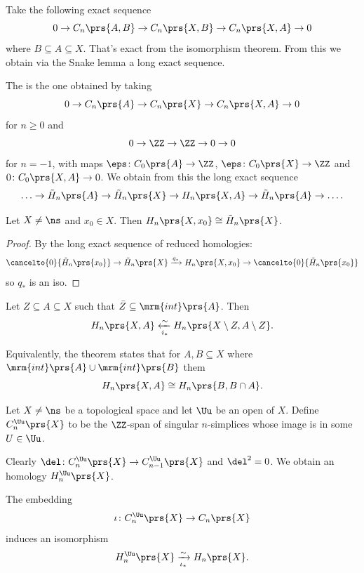 \documentclass[10pt,a4paper,twoside,openany,hidelinks]{book}
\newcommand{\ra}{\rightarrow}
\begin{document}
\begin{example}
Take the following exact sequence
\[0 \to C_n\prs{A,B} \to C_n\prs{X,B} \to C_n\prs{X,A} \to 0\]
where $B \subseteq A \subseteq X$. That's exact from the isomorphism theorem.
From this we obtain via the Snake lemma a long exact sequence.
\end{example}
\begin{definition}
The  is the one obtained by taking
\[0 \ra C_n\prs{A} \ra C_n\prs{X} \ra C_n\prs{X,A} \ra 0\]
for $n \geq 0$ and
\[0 \ra \ZZ \ra \ZZ \ra 0 \ra 0\]
for $n = -1$, with maps $\eps \colon C_0\prs{A} \to \ZZ$, $\eps \colon C_0\prs{X} \to \ZZ$ and $0 \colon C_0\prs{X,A} \to 0$.
We obtain from this the long exact sequence
\[\ldots \ra \tilde{H}_n\prs{A} \ra \tilde{H}_n\prs{X} \ra H_n\prs{X,A} \ra \tilde{H}_n\prs{A} \ra \ldots \text{.}\]
\end{definition}
\begin{lemma}
Let $X \neq \ns$ and $x_0 \in X$. Then $H_n\prs{X,x_0} \cong \tilde{H}_n\prs{X}$.
\end{lemma}
\begin{proof}
By the long exact sequence of reduced homologies:
\[\cancelto{0}{\tilde{H}_n\prs{x_0}} \to \tilde{H}_n \prs{X} \xrightarrow{q_*} H_n\prs{X,x_0} \to \cancelto{0}{\tilde{H}_n\prs{x_0}}\]
so $q_*$ is an iso.
\end{proof}
\begin{theorem}[Exision]
Let $Z \subseteq A \subseteq X$ such that $\bar{Z} \subseteq \mrm{int}\prs{A}$. Then
\[H_n\prs{X,A} \xleftarrow[i_*]{\sim} H_n\prs{X \setminus Z, A \setminus Z}\text{.}\]
\end{theorem}
\begin{remark}
Equivalently, the theorem states that for $A,B \subseteq X$ where $\mrm{int}\prs{A} \cup \mrm{int}\prs{B}$ them
\[H_n\prs{X,A} \cong H_n \prs{B, B\cap A}\text{.}\]
\end{remark}
\begin{definition}
Let $X \neq \ns$ be a topological space and let $\Uu$ be an open of $X$. Define $C_n^{\Uu}\prs{X}$ to be the $\ZZ$-span of singular $n$-simplices whose image is in some $U \in \Uu$.
\end{definition}
\begin{remark}
Clearly
$\del \colon C_n^{\Uu}\prs{X} \to C_{n-1}^{\Uu}\prs{X}$ and $\del^2 = 0$. We obtain an homology $H_n^{\Uu}\prs{X}$.
\end{remark}
\begin{theorem}
The embedding \[\iota \colon C_n^{\Uu}\prs{X} \to C_n\prs{X}\] induces an isomorphism
\[H_n^{\Uu}\prs{X} \xrightarrow[\iota_*]{\sim} H_n\prs{X} \text{.}\]
\end{theorem}
\end{document}
